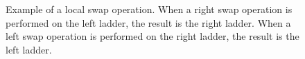 \begin{figure}[t]
\begin{minipage}{0.4\textwidth}
\begin{flushright}
		\end{flushright}
	\end{minipage}
	\caption{Example of a local swap operation. When a right swap operation is performed
	on the left ladder, the result is the right ladder. When a left swap operation is performed
	on the right ladder, the result is the left ladder.}
	\label{fig:rightSwap}
\end{figure}

\par







